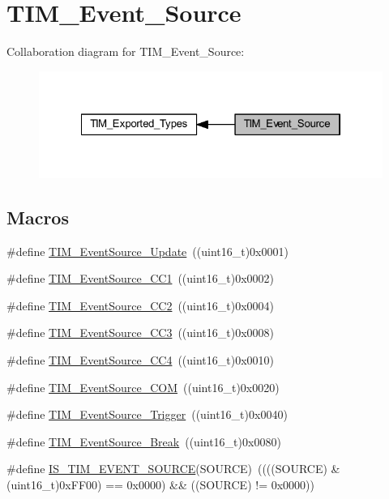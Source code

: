 \hypertarget{group___t_i_m___event___source}{}\section{T\+I\+M\+\_\+\+Event\+\_\+\+Source}
\label{group___t_i_m___event___source}
Collaboration diagram for T\+I\+M\+\_\+\+Event\+\_\+\+Source\+:
\nopagebreak
\begin{figure}[H]
\begin{center}
\leavevmode
\includegraphics[width=322pt]{group___t_i_m___event___source}
\end{center}
\end{figure}
\subsection*{Macros}
\begin{DoxyCompactItemize}
\item 
\#define \hyperlink{group___t_i_m___event___source_ga5bff72fbe94b1ae5a710e402c9868b23}{T\+I\+M\+\_\+\+Event\+Source\+\_\+\+Update}~((uint16\+\_\+t)0x0001)
\item 
\#define \hyperlink{group___t_i_m___event___source_gaa634c46d4ac521ad16e25be97b487e8a}{T\+I\+M\+\_\+\+Event\+Source\+\_\+\+C\+C1}~((uint16\+\_\+t)0x0002)
\item 
\#define \hyperlink{group___t_i_m___event___source_ga5e2082a09552acc9c7e9577f104ba15a}{T\+I\+M\+\_\+\+Event\+Source\+\_\+\+C\+C2}~((uint16\+\_\+t)0x0004)
\item 
\#define \hyperlink{group___t_i_m___event___source_gafeb8538e3b00d938e061e5051f83836b}{T\+I\+M\+\_\+\+Event\+Source\+\_\+\+C\+C3}~((uint16\+\_\+t)0x0008)
\item 
\#define \hyperlink{group___t_i_m___event___source_gab60e3190e6c09d2d067f2c689d614979}{T\+I\+M\+\_\+\+Event\+Source\+\_\+\+C\+C4}~((uint16\+\_\+t)0x0010)
\item 
\#define \hyperlink{group___t_i_m___event___source_ga4c06981037fae91786f966aa9b4b3435}{T\+I\+M\+\_\+\+Event\+Source\+\_\+\+C\+OM}~((uint16\+\_\+t)0x0020)
\item 
\#define \hyperlink{group___t_i_m___event___source_ga24835bf5eac25eed90069208dce22564}{T\+I\+M\+\_\+\+Event\+Source\+\_\+\+Trigger}~((uint16\+\_\+t)0x0040)
\item 
\#define \hyperlink{group___t_i_m___event___source_gad6f9b5366d93c73ff005273c50c9f00a}{T\+I\+M\+\_\+\+Event\+Source\+\_\+\+Break}~((uint16\+\_\+t)0x0080)
\item 
\#define \hyperlink{group___t_i_m___event___source_ga4ac88c3e43c8250114ea81a6e052d58a}{I\+S\+\_\+\+T\+I\+M\+\_\+\+E\+V\+E\+N\+T\+\_\+\+S\+O\+U\+R\+CE}(S\+O\+U\+R\+CE)~((((S\+O\+U\+R\+CE) \& (uint16\+\_\+t)0x\+F\+F00) == 0x0000) \&\& ((\+S\+O\+U\+R\+C\+E) != 0x0000))
\end{DoxyCompactItemize}


